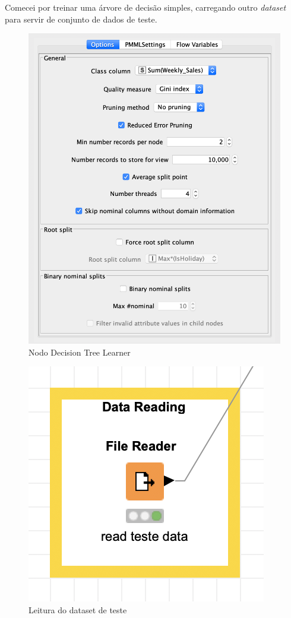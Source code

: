 Comecei por treinar uma árvore de decisão simples, carregando outro \textit{dataset} para servir de conjunto de dados de teste.

\begin{figure}[H]
    \centering
    \includegraphics[scale=0.4]{Images/T3_a.png}
    \caption{Nodo Decision Tree Learner}
\end{figure}

\begin{figure}[H]
    \centering
    \includegraphics[scale=0.5]{Images/T3_b1.png}
    \caption{Leitura do dataset de teste}
\end{figure}

